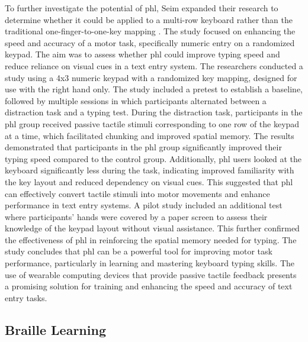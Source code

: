 To further investigate the potential of \gls{phl}, Seim expanded their research to determine whether it could be applied to a multi-row keyboard rather than the traditional one-finger-to-one-key mapping \cite{Seim2017}. The study focused on enhancing the speed and accuracy of a motor task, specifically numeric entry on a randomized keypad. The aim was to assess whether \gls{phl} could improve typing speed and reduce reliance on visual cues in a text entry system.
The researchers conducted a study using a 4x3 numeric keypad with a randomized key mapping, designed for use with the right hand only. The study included a pretest to establish a baseline, followed by multiple sessions in which participants alternated between a distraction task and a typing test. During the distraction task, participants in the \gls{phl} group received passive tactile stimuli corresponding to one row of the keypad at a time, which facilitated chunking and improved spatial memory.
The results demonstrated that participants in the \gls{phl} group significantly improved their typing speed compared to the control group. Additionally, \gls{phl} users looked at the keyboard significantly less during the task, indicating improved familiarity with the key layout and reduced dependency on visual cues. This suggested that \gls{phl} can effectively convert tactile stimuli into motor movements and enhance performance in text entry systems.
A pilot study included an additional test where participants’ hands were covered by a paper screen to assess their knowledge of the keypad layout without visual assistance. This further confirmed the effectiveness of \gls{phl} in reinforcing the spatial memory needed for typing.
The study concludes that \gls{phl} can be a powerful tool for improving motor task performance, particularly in learning and mastering keyboard typing skills. The use of wearable computing devices that provide passive tactile feedback presents a promising solution for training and enhancing the speed and accuracy of text entry tasks.

\subsection{Braille Learning}

